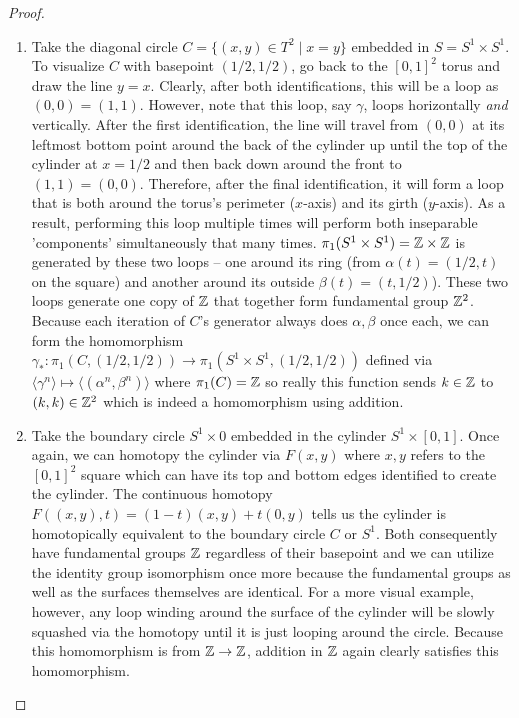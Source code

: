 \begin{proof}
\begin{enumerate}[label = (\alph*)]
        \item Take the diagonal circle $C = \{(x,y) \in T^2 \mid x=y\}$ embedded in $S = S^1\times S^1$. To visualize $C$ with basepoint $(1/2,1/2)$, go back to the $[0,1]^2$ torus and draw the line $y = x.$ Clearly, after both identifications, this will be a loop as $(0,0) = (1,1).$ However, note that this loop, say $\gamma$, loops horizontally \emph{and} vertically. After the first identification, the line will travel from $(0,0)$ at its leftmost bottom point around the back of the cylinder up until the top of the cylinder at $x=1/2$ and then back down around the front to $(1,1) = (0,0)$. Therefore, after the final identification, it will form a loop that is both around the torus's perimeter ($x$-axis) and its girth ($y$-axis). As a result, performing this loop multiple times will perform both inseparable 'components' simultaneously that many times. $\pi_1(S^1 \times S^1) = \mathbb{Z}\times\mathbb{Z}$ is generated by these two loops – one around its ring (from $\alpha(t) = (1/2,t)$ on the square) and another around its outside $\beta(t) = (t, 1/2)$). These two loops generate one copy of $\mathbb{Z}$ that together form fundamental group $\mathbb{Z}^2$. Because each iteration of $C$'s generator always does $\alpha, \beta$ once each, we can form the homomorphism $\gamma_*\colon\pi_1(C,(1/2,1/2))\to\pi_1(S^1\times S^1,(1/2,1/2))$ defined via $\langle \gamma^n \rangle \mapsto \langle(\alpha^n, \beta^n) \rangle$ where $\pi_1(C) = \mathbb{Z}$ so really this function sends $k \in \mathbb{Z}$ to $(k,k) \in \mathbb{Z}^2$ which is indeed a homomorphism using addition.

        \item Take the boundary circle $S^{1}\times{0}$ embedded in the cylinder $S^1 \times [0,1]$. Once again, we can homotopy the cylinder via $F(x,y)$ where $x,y$ refers to the $[0,1]^2$ square which can have its top and bottom edges identified to create the cylinder. The continuous homotopy $F((x,y),t) = (1-t)(x,y) + t(0,y)$ tells us the cylinder is homotopically equivalent to the boundary circle $C$ or $S^1$. Both consequently have fundamental groups $\mathbb{Z}$ regardless of their basepoint and we can utilize the identity group isomorphism once more because the fundamental groups as well as the surfaces themselves are identical. For a more visual example, however, any loop winding around the surface of the cylinder will be slowly squashed via the homotopy until it is just looping around the circle. Because this homomorphism is from $\mathbb{Z}\to\mathbb{Z}$, addition in $\mathbb{Z}$ again clearly satisfies this homomorphism.
    \end{enumerate}
\end{proof}